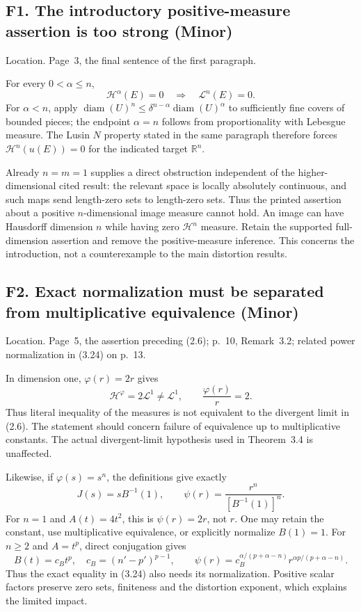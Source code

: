 \documentclass[10pt]{article}
\begin{document}
\subsection*{F1. The introductory positive-measure assertion is too strong (Minor)}
Location. Page 3, the final sentence of the first paragraph.\par
For every \(0<\alpha\le n\), \[\mathcal H^\alpha(E)=0\quad\Longrightarrow\quad \mathcal L^n(E)=0.\] For \(\alpha<n\), apply \(\operatorname{diam}(U)^n\le\delta^{n-\alpha}\operatorname{diam}(U)^\alpha\) to sufficiently fine covers of bounded pieces; the endpoint \(\alpha=n\) follows from proportionality with Lebesgue measure. The Lusin \(N\) property stated in the same paragraph therefore forces \(\mathcal H^n(u(E))=0\) for the indicated target \(\mathbb R^n\).\par
Already \(n=m=1\) supplies a direct obstruction independent of the higher-dimensional cited result: the relevant space is locally absolutely continuous, and such maps send length-zero sets to length-zero sets. Thus the printed assertion about a positive \(n\)-dimensional image measure cannot hold. An image can have Hausdorff dimension \(n\) while having zero \(\mathcal H^n\) measure. Retain the supported full-dimension assertion and remove the positive-measure inference. This concerns the introduction, not a counterexample to the main distortion results.\par
\subsection*{F2. Exact normalization must be separated from multiplicative equivalence (Minor)}
Location. Page 5, the assertion preceding (2.6); p. 10, Remark 3.2; related power normalization in (3.24) on p. 13.\par
In dimension one, \(\varphi(r)=2r\) gives \[\mathcal H^\varphi=2\mathcal L^1\ne\mathcal L^1,\qquad
 \frac{\varphi(r)}r=2.\] Thus literal inequality of the measures is not equivalent to the divergent limit in (2.6). The statement should concern failure of equivalence up to multiplicative constants. The actual divergent-limit hypothesis used in Theorem 3.4 is unaffected.\par
Likewise, if \(\varphi(s)=s^n\), the definitions give exactly \[J(s)=sB^{-1}(1),\qquad
 \psi(r)=\frac{r^n}{[B^{-1}(1)]^n}.\] For \(n=1\) and \(A(t)=4t^2\), this is \(\psi(r)=2r\), not \(r\). One may retain the constant, use multiplicative equivalence, or explicitly normalize \(B(1)=1\). For \(n\ge2\) and \(A=t^p\), direct conjugation gives \[B(t)=c_Bt^p,\quad c_B=(n'-p')^{p-1},\qquad
 \psi(r)=c_B^{\alpha/(p+\alpha-n)}
 r^{\alpha p/(p+\alpha-n)}.\] Thus the exact equality in (3.24) also needs its normalization. Positive scalar factors preserve zero sets, finiteness and the distortion exponent, which explains the limited impact.\par
\end{document}
